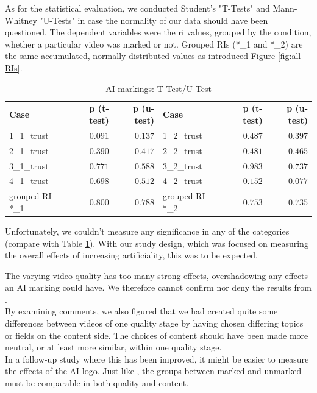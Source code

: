 \documentclass[
  a4paper,  %
  twoside,  %
  bibliography=totoc,
  headsepline,
  cleardoublepage=empty,
  parskip=half,
  draft=false
]{scrbook}
\begin{document}
As for the statistical evaluation, we conducted Student's "T-Tests" and Mann-Whitney "U-Tests" in case the normality of our data should have been questioned. The dependent variables were the \gls{ri} values, grouped by the condition, whether a particular video was marked or not. Grouped RIs (*\_1 and *\_2) are the same accumulated, normally distributed values as introduced Figure \ref{fig:all-RIs}.
\begin{table}[h]
	\centering
	\caption{AI markings: T-Test/U-Test}
	\label{tab:ttest_logo-trust}
	{
		\begin{tabular}{lrr|lrr}
			\toprule
			\textbf{Case} & \textbf{p (t-test)} & \textbf{p (u-test)} & \textbf{Case} & \textbf{p (t-test)} & \textbf{p (u-test)}  \\
			\cmidrule[0.4pt]{1-6}
			1\_1\_trust & $0.091$ & $0.137$ & 1\_2\_trust & $0.487$ & $0.397$ \\
			2\_1\_trust & $0.390$ & $0.417$ & 2\_2\_trust & $0.481$ & $0.465$ \\
			3\_1\_trust & $0.771$ & $0.588$ & 3\_2\_trust & $0.983$ & $0.737$ \\
			4\_1\_trust & $0.698$ & $0.512$ & 4\_2\_trust & $0.152$ & $0.077$ \\
			grouped RI *\_1 & $0.800$ & $0.788$ & grouped RI *\_2 & $0.753$ & $0.735$\\
			\bottomrule
		\end{tabular}
	}
\end{table}
Unfortunately, we couldn't measure any significance in any of the categories (compare with Table \ref{tab:ttest_logo-trust}). With our study design, which was focused on measuring the overall effects of increasing artificiality, this was to be expected. 

The varying video quality has too many strong effects, overshadowing any effects an AI marking could have. We therefore cannot confirm nor deny the results from .\\
By examining comments, we also figured that we had created quite some differences between videos of one quality stage by having chosen differing topics or fields on the content side. The choices of content should have been made more neutral, or at least more similar, within one quality stage. \\
In a follow-up study where this has been improved, it might be easier to measure the effects of the AI logo. Just like , the groups between marked and unmarked must be comparable in both quality and content.
\end{document}
